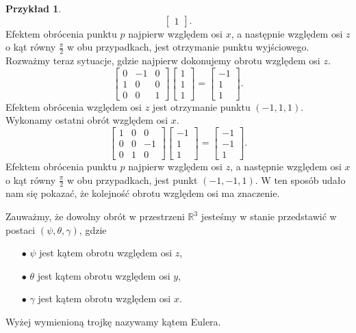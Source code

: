 \documentclass[a4paper,twoside,11pt,reqno]{mwrep}
\theoremstyle{plain} \newtheorem{twr}{Twierdzenie}
\theoremstyle{plain} \newtheorem{lem}{Lemat}
\theoremstyle{definition} \newtheorem{defi}{Definicja}
\theoremstyle{remark} \newtheorem*{wni}{Wniosek}
\theoremstyle{definition} \newtheorem{uwaga}{Uwaga}
\theoremstyle{definition}\newtheorem{prz}{Przykład}
\begin{document}
\begin{prz}
$$\begin{bmatrix}
1 
\end{bmatrix}.$$
Efektem obrócenia punktu $p$ najpierw względem osi $x$, a następnie względem osi $z$ o kąt równy $\frac{\pi}{2}$ w obu przypadkach, jest otrzymanie punktu wyjściowego.
Rozważmy teraz sytuacje, gdzie najpierw dokonujemy obrotu względem osi $z$.
$$\begin{bmatrix}
0   & -1&0 \\
1 & 0 & 0\\
0&0&1
\end{bmatrix}\begin{bmatrix}
 1\\
1\\
1 
\end{bmatrix} = \begin{bmatrix}
 -1\\
1\\
1 
\end{bmatrix}.$$
Efektem obrócenia względem osi $z$ jest otrzymanie punktu $(-1,1,1)$.
Wykonamy ostatni obrót względem osi $x$.
$$\begin{bmatrix}
 1&0&0\\
0&0   & -1\\
0&1 & 0
\end{bmatrix}\begin{bmatrix}
 -1\\
1\\
1 
\end{bmatrix} = \begin{bmatrix}
-1\\
-1\\
1 
\end{bmatrix}. $$
Efektem obrócenia punktu $p$ najpierw względem osi $z$, a następnie względem osi $x$ o kąt równy $\frac{\pi}{2}$ w obu przypadkach, jest punkt $(-1,-1,1)$. 
W ten sposób udało nam się pokazać, że kolejność obrotu względem osi ma znaczenie.
\end{prz}

Zauważmy, że dowolny obrót w przestrzeni $\mathbb{R}^3$ jesteśmy w stanie przedstawić
w postaci 
$(\psi,\theta,\gamma)$, gdzie 
\begin{itemize}
\item[$\bullet$] $\psi$ jest kątem obrotu względem osi $z$,
\item[$\bullet$] $\theta$ jest kątem obrotu względem osi $y$,
\item[$\bullet$] $\gamma$ jest kątem obrotu względem osi $x$.
\end{itemize}
Wyżej wymienioną trojkę nazywamy kątem Eulera.
\end{document}
